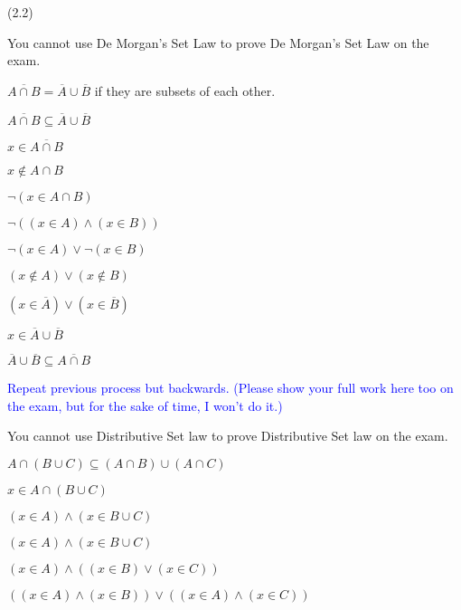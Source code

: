 \documentclass{exam}
\begin{document}
\begin{questions}
\newpage

 (2.2)
\begin{subparts}

\begin{center}

You cannot use De Morgan's Set Law to prove De Morgan's Set Law on the exam.

\( \overline{A \cap B} = \overline{A} \cup \overline{B} \) if they are subsets of each other.

\( \overline{A \cap B} \subseteq \overline{A} \cup \overline{B} \)

\( x \in \overline{A \cap B} \)

\( x \notin {A \cap B} \)

\( \neg (x \in {A \cap B}) \)

\( \neg ( (x \in A) \land (x \in B) ) \)

\( \neg(x \in A) \lor \neg (x \in B) \)

\( (x \notin A) \lor (x \notin B) \)

\( (x \in \overline{A}) \lor (x \in \overline{B}) \)

\( x \in \overline{A} \cup \overline{B} \)
\vspace{5mm}

\( \overline{A} \cup \overline{B} \subseteq \overline{A \cap B} \)

\textcolor{blue}{Repeat previous process but backwards. (Please show your full work here too on the exam, but for the sake of time, I won't do it.)}

\end{center}


\begin{center}

You cannot use Distributive Set law to prove Distributive Set law on the exam.

\( A \cap (B \cup C) \subseteq (A \cap B) \cup (A \cap C) \)

\( x \in A \cap (B \cup C)\)

\( (x \in A) \land (x \in B \cup C)\)

\( (x \in A) \land (x \in B \cup C)\)

\( (x \in A) \land ((x \in B) \lor (x \in C))\)

\( ((x \in A) \land (x \in B)) \lor ((x \in A) \land (x \in C))\)


\end{center}
\end{subparts}
\end{questions}
\end{document}
